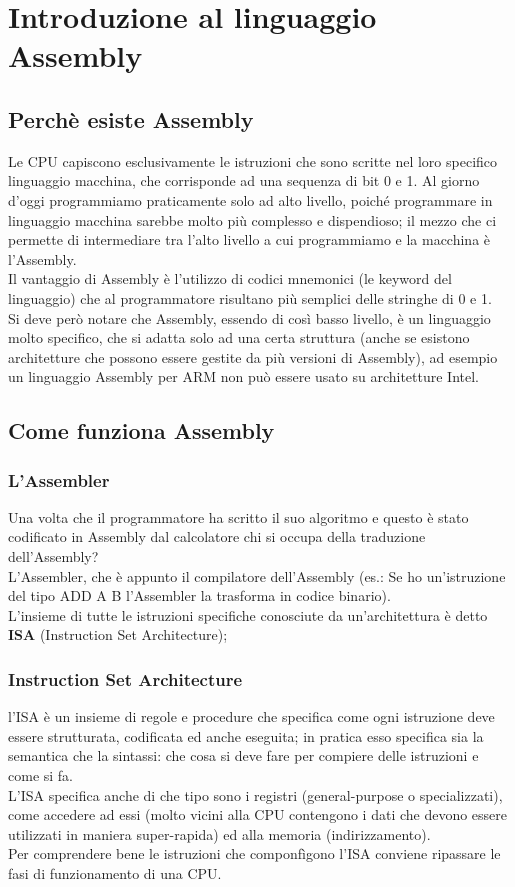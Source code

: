 \chapter{Introduzione al linguaggio Assembly}

\section{Perchè esiste Assembly}

Le CPU capiscono esclusivamente le istruzioni che sono scritte nel loro specifico linguaggio macchina, che corrisponde ad una sequenza di bit 0 e 1. 
Al giorno d’oggi programmiamo praticamente solo ad alto livello,  poiché programmare in linguaggio macchina sarebbe molto più complesso e dispendioso; il mezzo che ci permette di intermediare  tra l'alto livello a cui programmiamo e la macchina è l’Assembly.\\
Il vantaggio di Assembly è l’utilizzo di codici mnemonici  (le keyword del linguaggio) che al programmatore risultano più semplici delle stringhe di 0 e 1.\\
Si deve però notare che Assembly, essendo di così basso livello, è un linguaggio molto specifico, che si adatta solo ad una certa struttura (anche se esistono architetture che possono essere gestite da più versioni di Assembly), ad esempio un linguaggio Assembly per ARM non può essere usato su architetture Intel.

\section{Come funziona Assembly}

\subsection{L'Assembler}
Una volta che il programmatore ha scritto il suo algoritmo e questo è stato codificato in Assembly dal calcolatore chi si occupa della traduzione dell’Assembly?\\ 
L’Assembler, che è appunto il compilatore dell’Assembly (es.: Se ho un’istruzione del tipo ADD A B l’Assembler la trasforma in codice binario).\\
L’insieme di tutte le istruzioni specifiche conosciute da un’architettura è detto \textbf{ISA} (Instruction Set Architecture); 

\subsection{Instruction Set Architecture}
l’ISA è un insieme di regole e procedure che specifica come ogni istruzione deve essere strutturata, codificata ed anche eseguita; in pratica esso specifica sia la semantica che la sintassi: che cosa si deve fare per compiere delle istruzioni e come si fa.\\
L’ISA specifica anche di che tipo sono i registri (general-purpose o  specializzati), come accedere ad essi (molto vicini alla CPU contengono i dati che devono essere utilizzati in maniera super-rapida) ed alla memoria (indirizzamento).\\
Per comprendere bene le istruzioni che componfìgono l'ISA conviene ripassare le fasi di funzionamento di una CPU.


